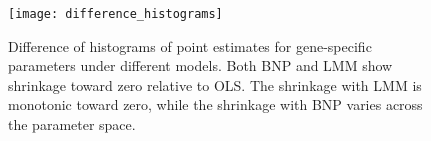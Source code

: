 {\begin{figure}[ht]
\centering
\texttt{[image: difference\_histograms]}
\caption{\small Difference of histograms of point estimates for gene-specific parameters under different models. Both BNP and LMM show shrinkage toward zero relative to OLS. The shrinkage with LMM is monotonic toward zero, while the shrinkage with BNP varies across the parameter space.}
\label{diff-hist}
\end{figure}


% 
% 

}
